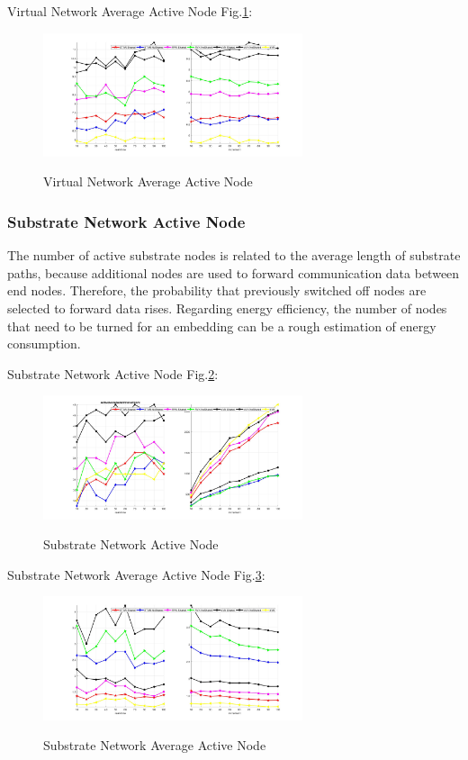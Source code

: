 Virtual Network Average Active Node Fig.\ref{fig:ActiveNodeAverageVirtualNetwork}:
\begin{figure}[htbp]
  \centering
  \includegraphics[width=3in]{Fig/ActiveNodeAverageVirtualNetwork}\\
  \caption{Virtual Network Average Active Node}\label{fig:ActiveNodeAverageVirtualNetwork}
\end{figure}

\subsubsection{Substrate Network Active Node}
The number of active substrate nodes is related to the average length of substrate paths, because additional nodes are used to forward communication data between end nodes. Therefore, the probability that previously switched off nodes are selected to forward data rises. Regarding energy efficiency, the number of nodes that need to be turned for an embedding can be a rough estimation of energy consumption.

Substrate Network Active Node Fig.\ref{fig:ActiveNodeSubstrateNetwork}:
\begin{figure}[htbp]
  \centering
  \includegraphics[width=3in]{Fig/ActiveNodeSubstrateNetwork}\\
  \caption{Substrate Network Active Node}\label{fig:ActiveNodeSubstrateNetwork}
\end{figure}


Substrate Network Average Active Node Fig.\ref{fig:ActiveNodeAverageSubstrateNetwork}:
\begin{figure}[htbp]
  \centering
  \includegraphics[width=3in]{Fig/ActiveNodeAverageSubstrateNetwork}\\
  \caption{Substrate Network Average Active Node }\label{fig:ActiveNodeAverageSubstrateNetwork}
\end{figure}

